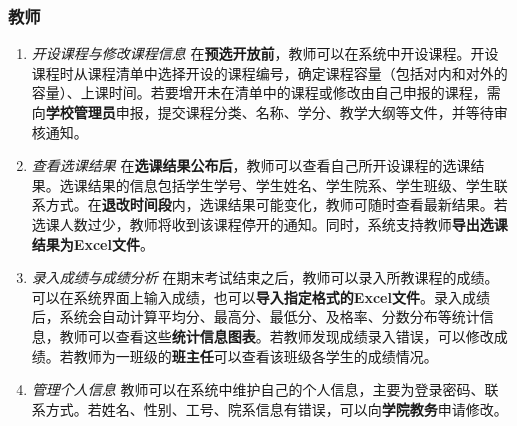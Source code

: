 \subsubsection{教师}
\begin{enumerate}
    \item \textit{开设课程与修改课程信息} \quad 在\textbf{预选开放前}，教师可以在系统中开设课程。开设课程时从课程清单中选择开设的课程编号，确定课程容量（包括对内和对外的容量）、上课时间。若要增开未在清单中的课程或修改由自己申报的课程，需向\textbf{学校管理员}申报，提交课程分类、名称、学分、教学大纲等文件，并等待审核通知。
    \item \textit{查看选课结果} \quad 在\textbf{选课结果公布后}，教师可以查看自己所开设课程的选课结果。选课结果的信息包括学生学号、学生姓名、学生院系、学生班级、学生联系方式。在\textbf{退改时间段}内，选课结果可能变化，教师可随时查看最新结果。若选课人数过少，教师将收到该课程停开的通知。同时，系统支持教师\textbf{导出选课结果为Excel文件}。
    \item \textit{录入成绩与成绩分析} \quad 在期末考试结束之后，教师可以录入所教课程的成绩。可以在系统界面上输入成绩，也可以\textbf{导入指定格式的Excel文件}。录入成绩后，系统会自动计算平均分、最高分、最低分、及格率、分数分布等统计信息，教师可以查看这些\textbf{统计信息图表}。若教师发现成绩录入错误，可以修改成绩。若教师为一班级的\textbf{班主任}可以查看该班级各学生的成绩情况。
    \item \textit{管理个人信息} \quad 教师可以在系统中维护自己的个人信息，主要为登录密码、联系方式。若姓名、性别、工号、院系信息有错误，可以向\textbf{学院教务}申请修改。
\end{enumerate}

